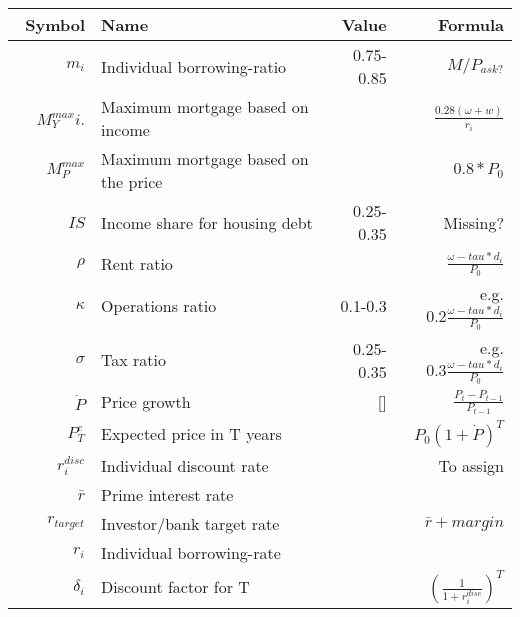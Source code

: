 \renewcommand{\arraystretch}{1.5}
\begin{tabular}{rlrr}\
Symbol         & Name                                 & Value      & Formula  \\ \hline
$m_i$          & Individual borrowing-ratio           & 0.75-0.85  & $M/P_{ask?}$ \\
$M^{max}_Yi$.  & Maximum mortgage based on income     &            & $\frac{0.28(\omega+w)}{r_i}$ \\
 $M^{max}_P$   & Maximum mortgage based on the price  &            & $0.8*P_0$ \\
$IS$           & Income share for housing debt        & 0.25-0.35  & Missing? \\
$\rho$         & Rent ratio                           &            & $\frac{\omega-tau*d_i}{P_0}$ \\
$\kappa $      & Operations ratio                     & 0.1-0.3    & e.g. $ 0.2\frac{\omega-tau*d_i}{P_0}$ \\
$\sigma$       & Tax ratio                            & 0.25-0.35  & e.g. $ 0.3\frac{\omega-tau*d_i}{P_0}$ \\
$\dot P $      & Price growth                         &[]          & $\frac{P_t-P_{t-1}}{P_{t-1}}$\\
$P^e_T$        & Expected price in T years            &            & $P_0(1+\dot P)^T$ \\
$r^{disc}_i$   & Individual discount rate             &            & To assign \\
$\bar r$       & Prime interest rate                  &            & \\
$r_{target}$   & Investor/bank target rate            &            & $\bar r + margin$ \\
$r_i$          & Individual borrowing-rate            &            & \\
$\delta_i$     & Discount factor for T                &            & $\left(\frac{1}{1+r^{disc}_i}\right)^T$ \\
\end{tabular}
\renewcommand{\arraystretch}{1.0}


  
    
    
